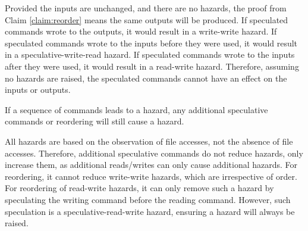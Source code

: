 \proof Provided the inputs are unchanged, and there are no hazards, the proof from Claim \ref{claim:reorder} means the same outputs will be produced. If speculated commands wrote to the outputs, it would result in a write-write hazard. If speculated commands wrote to the inputs before they were used, it would result in a speculative-write-read hazard. If speculated commands wrote to the inputs after they were used, it would result in a read-write hazard. Therefore, assuming no hazards are raised, the speculated commands cannot have an effect on the inputs or outputs.

\begin{claim}
\label{claim:keep_hazards}

 If a sequence of commands leads to a hazard, any additional speculative commands or reordering will still cause a hazard.
\end{claim}

\proof All hazards are based on the observation of file accesses, not the absence of file accesses. Therefore, additional speculative commands do not reduce hazards, only increase them, as additional reads/writes can only cause additional hazards. For reordering, it cannot reduce write-write hazards, which are irrespective of order. For reordering of read-write hazards, it can only remove such a hazard by speculating the writing command before the reading command. However, such speculation is a speculative-read-write hazard, ensuring a hazard will always be raised.

